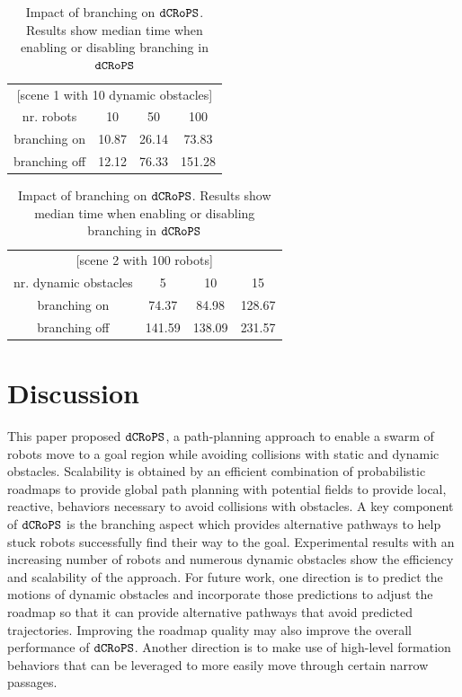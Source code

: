 \documentclass[letterpaper, 10pt, conference]{ieeeconf}
\newcommand{\Acronym}[1]{\ensuremath{{\small{\texttt{#1}}}}}
\newcommand{\Name}{\Acronym{dCRoPS}}
\begin{document}
\begin{table}
\centering
\begin{tabular}{c|c|c|c}
\multicolumn{4}{c}{[scene 1 with 10 dynamic obstacles]}\\
 nr. robots   & 10    &  50 & 100\\\hline
 branching on & 10.87 & 26.14 & 73.83 \\
 branching off& 12.12 & 76.33 & 151.28 
\end{tabular}

\vspace*{2mm}

\begin{tabular}{c|c|c|c}
\multicolumn{4}{c}{[scene 2 with 100 robots]}\\
 nr. dynamic obstacles  & 5    &  10 & 15\\\hline
 branching on & 74.37 & 84.98 & 128.67 \\
 branching off& 141.59 & 138.09 & 231.57 
\end{tabular}

\caption{Impact of branching on $\Name$. Results show median time
  when enabling or disabling branching in $\Name$}
\label{table}
\end{table}





\section{Discussion}

This paper proposed $\Name$, a path-planning approach to enable a
swarm of robots move to a goal region while avoiding collisions with
static and dynamic obstacles. Scalability is obtained by an efficient
combination of probabilistic roadmaps to provide global path planning
with potential fields to provide local, reactive, behaviors necessary
to avoid collisions with obstacles. A key component of $\Name$ is the
branching aspect which provides alternative pathways to help stuck
robots successfully find their way to the goal. Experimental results
with an increasing number of robots and numerous dynamic obstacles
show the efficiency and scalability of the approach.  For future work,
one direction is to predict the motions of dynamic obstacles and
incorporate those predictions to adjust the roadmap so that it can
provide alternative pathways that avoid predicted
trajectories. Improving the roadmap quality may also improve the
overall performance of $\Name$. Another direction is to make use of
high-level formation behaviors that can be leveraged to more easily
move through certain narrow passages.

 

\end{document}
